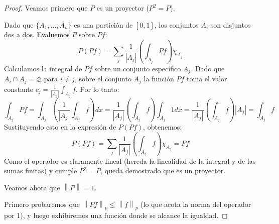 \documentclass{article}
\theoremstyle{definition}
\newcommand{\norm}[1]{\left\lVert #1 \right\rVert}       %
\begin{document}
\begin{proof}
	Veamos primero que \( P \) es un proyector (\(P^2 = P\)).

	Dado que \( \{A_1, \dots, A_n\} \) es una partición de \([0,1]\), los conjuntos \(A_i\) son disjuntos dos a dos. Evaluemos \(P\) sobre \(Pf\):
	\[
		P(Pf) = \sum_{j} \frac{1}{|A_j|} \left( \int_{A_j} Pf \right) \chi_{A_j}
	\]
	Calculamos la integral de \(Pf\) sobre un conjunto específico \(A_j\). Dado que \(A_i \cap A_j = \varnothing \) para \(i \neq j\), sobre el conjunto \(A_j\) la función \(Pf\) toma el valor constante \(c_j = \frac{1}{|A_j|} \int_{A_j} f\). Por lo tanto:
	\[
		\int_{A_j} Pf = \int_{A_j} \left( \frac{1}{|A_j|} \int_{A_j} f \right) dx = \frac{1}{|A_j|} \left( \int_{A_j} f \right) \int_{A_j} 1 dx = \frac{1}{|A_j|} \left( \int_{A_j} f \right) |A_j| = \int_{A_j} f
	\]
	Sustituyendo esto en la expresión de \(P(Pf)\), obtenemos:
	\[
		P(Pf) = \sum_{j} \frac{1}{|A_j|} \left( \int_{A_j} f \right) \chi_{A_j} = Pf
	\]
	Como el operador es claramente lineal (hereda la linealidad de la integral y de las sumas finitas) y cumple \(P^2 = P\), queda demostrado que es un proyector.

	\vspace{0.5cm}

	Veamos ahora que \(\norm{P} = 1\).

	Primero probaremos que \(\norm{Pf}_p \le \norm{f}_p\) (lo que acota la norma del operador por 1), y luego exhibiremos una función donde se alcance la igualdad.


\end{proof}
\end{document}

